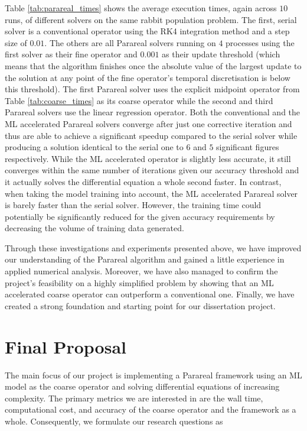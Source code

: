 \documentclass{article}
\begin{document}
Table \ref{tab:parareal_times} shows the average execution times, again across $10$ runs, of different solvers on the same rabbit population problem. The first, serial solver is a conventional operator using the RK4 integration method and a step size of $0.01$. The others are all Parareal solvers running on $4$ processes using the first solver as their fine operator and $0.001$ as their update threshold (which means that the algorithm finishes once the absolute value of the largest update to the solution at any point of the fine operator's temporal discretisation is below this threshold). The first Parareal solver uses the explicit midpoint operator from Table \ref{tab:coarse_times} as its coarse operator while the second and third Parareal solvers use the linear regression operator. Both the conventional and the ML accelerated Parareal solvers converge after just one corrective iteration and thus are able to achieve a significant speedup compared to the serial solver while producing a solution identical to the serial one to $6$ and $5$ significant figures respectively. While the ML accelerated operator is slightly less accurate, it still converges within the same number of iterations given our accuracy threshold and it actually solves the differential equation a whole second faster. In contrast, when taking the model training into account, the ML accelerated Parareal solver is barely  faster than the serial solver. However, the training time could potentially be significantly reduced for the given accuracy requirements by decreasing the volume of training data generated.

Through these investigations and experiments presented above, we have improved our understanding of the Parareal algorithm and gained a little experience in applied numerical analysis. Moreover, we have also managed to confirm the project's feasibility on a highly simplified problem by showing that an ML accelerated coarse operator can outperform a conventional one. Finally, we have created a strong foundation and starting point for our dissertation project.

\section{Final Proposal}

The main focus of our project is implementing a Parareal framework using an ML model as the coarse operator and solving differential equations of increasing complexity. The primary metrics we are interested in are the wall time, computational cost, and accuracy of the coarse operator and the framework as a whole. Consequently, we formulate our research questions as
\end{document}
